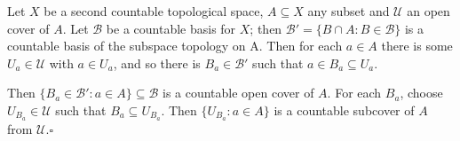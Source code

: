 \documentclass[12pt]{article}
\begin{document}
Let $X$ be a second countable topological space, $A\subseteq X$
any subset and $\mathcal{U}$ an open cover of $A$.  Let
$\mathcal{B}$ be a countable basis for $X$; then $\mathcal{B}' =
\{B\cap A\colon B\in\mathcal{B}\}$ is a countable basis of the
subspace topology on A.  Then for each $a\in A$ there is some
$U_a\in\mathcal{U}$ with $a\in U_a$, and so there is
$B_a\in\mathcal{B}'$ such that $a\in B_a\subseteq U_a$.

Then $\{B_a\in\mathcal{B}'\colon a\in A\}\subseteq\mathcal{B}$ is
a countable open cover of $A$.  For each $B_a$, choose
$U_{B_a}\in\mathcal{U}$ such that $B_a\subseteq U_{B_a}$.  Then
$\{ U_{B_a}\colon a\in A\}$ is a countable subcover of $A$ from
$\mathcal{U}$.$\square$
\end{document}
